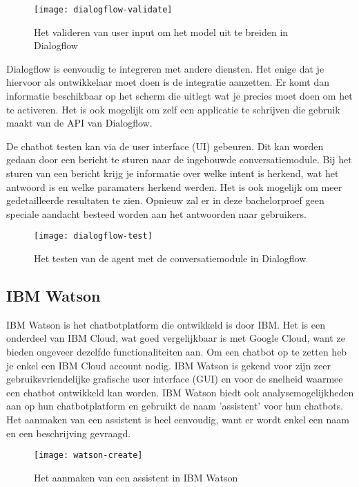 \begin{figure}[H]
    \label{fig:dialogflow-validate}
    \centering
    \texttt{[image: dialogflow-validate]}
    \caption{Het valideren van user input om het model uit te breiden in Dialogflow}
\end{figure}

Dialogflow is eenvoudig te integreren met andere diensten. Het enige dat je hiervoor als ontwikkelaar moet doen is de integratie aanzetten. Er komt dan informatie beschikbaar op het scherm die uitlegt wat je precies moet doen om het te activeren. Het is ook mogelijk om zelf een applicatie te schrijven die gebruik maakt van de API van Dialogflow.

De chatbot testen kan via de user interface (UI) gebeuren. Dit kan worden gedaan door een bericht te sturen naar de ingebouwde conversatiemodule. Bij het sturen van een bericht krijg je informatie over welke intent is herkend, wat het antwoord is en welke paramaters herkend werden. Het is ook mogelijk om meer gedetailleerde resultaten te zien. Opnieuw zal er in deze bachelorproef geen speciale aandacht besteed worden aan het antwoorden naar gebruikers.

\begin{figure}[H]
    \label{fig:dialogflow-test}
    \centering
    \texttt{[image: dialogflow-test]}
    \caption{Het testen van de agent met de conversatiemodule in Dialogflow}
\end{figure}

\subsection{IBM Watson}
\label{subsec:werking-platformen-ibm-watson}

IBM Watson is het chatbotplatform die ontwikkeld is door IBM. Het is een onderdeel van IBM Cloud, wat goed vergelijkbaar is met Google Cloud, want ze bieden ongeveer dezelfde functionaliteiten aan. Om een chatbot op te zetten heb je enkel een IBM Cloud account nodig. IBM Watson is gekend voor zijn zeer gebruiksvriendelijke grafische user interface (GUI) en voor de snelheid waarmee een chatbot ontwikkeld kan worden. IBM Watson biedt ook analysemogelijkheden aan op hun chatbotplatform en gebruikt de naam 'assistent' voor hun chatbots. Het aanmaken van een assistent is heel eenvoudig, want er wordt enkel een naam en een beschrijving gevraagd.

\begin{figure}[H]
    \label{fig:watson-create}
    \centering
    \texttt{[image: watson-create]}
    \caption{Het aanmaken van een assistent in IBM Watson}
\end{figure}

